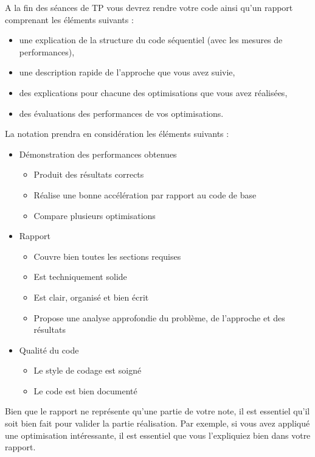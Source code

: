 \documentclass[11pt]{paper}
\begin{document}
A la fin des séances de TP vous devrez rendre votre code ainsi qu'un rapport comprenant les éléments suivants :
\begin{itemize}
	\item une explication de la structure du code séquentiel (avec les mesures de performances),
	\item une description rapide de l'approche que vous avez suivie,
	\item des explications pour chacune des optimisations que vous avez réalisées,
	\item des évaluations des performances de vos optimisations.\medskip
\end{itemize}

La notation prendra en considération les éléments suivants :
\begin{itemize}
	\item Démonstration des performances obtenues
	\begin{itemize}
		\item Produit des résultats corrects
		\item Réalise une bonne accélération par rapport au code de base
		\item Compare plusieurs optimisations
	\end{itemize}

	\item Rapport
	\begin{itemize}
		\item Couvre bien toutes les sections requises 
		\item Est techniquement solide
		\item Est clair, organisé et bien écrit
		\item Propose une analyse approfondie du problème, de l'approche et des résultats
	\end{itemize}
	
	\item Qualité du code
	\begin{itemize}
		\item Le  style de codage est soigné
		\item Le code est bien documenté 
	\end{itemize}
\end{itemize}

Bien que le rapport ne représente qu'une partie de votre note, il est essentiel qu'il soit bien fait pour valider la partie réalisation. Par exemple, si vous avez appliqué une optimisation intéressante, il est essentiel que vous l'expliquiez bien dans votre rapport.
\end{document}
